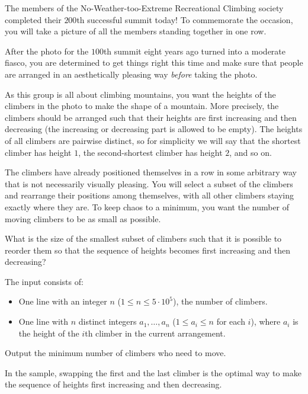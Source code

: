 

\newcommand{\maxn}{5 \cdot 10^5}

The members of the No-Weather-too-Extreme Recreational Climbing society
completed their $200$th successful summit today! To commemorate the occasion,
you will take a picture of all the members standing together in one row.

After the photo for the $100$th summit eight years ago turned into a moderate
fiasco, you are determined to get things right this time and make sure that
people are arranged in an aesthetically pleasing way \textit{before} taking the
photo.

As this group is all about climbing mountains, you want the heights of the
climbers in the photo to make the shape of a mountain. More
precisely, the climbers
should be arranged such that their heights are first increasing and then
decreasing (the increasing or decreasing part is allowed to be empty). The
heights of all climbers are pairwise distinct, so for simplicity we will say
that the shortest climber has height $1$, the second-shortest climber has
height $2$, and so on.

The climbers have already positioned themselves in a row in some arbitrary way
that is not necessarily visually pleasing. You will select a subset of the
climbers and rearrange their positions among themselves, with all other climbers
staying exactly where they are. To keep chaos to a minimum, you want the number
of moving climbers to be as small as possible.

What is the size of the smallest subset of climbers such that it is possible
to reorder them so that the sequence of heights becomes first increasing and then
decreasing?

\begin{Input}
    The input consists of:
    \begin{itemize}
        \item One line with an integer $n$ ($1\leq n\leq \maxn$), the number of
			climbers.
        \item One line with $n$ distinct integers $a_1, \ldots, a_n$ ($1 \leq a_i \leq n$ for each $i$), where $a_i$ is the height of the $i$th climber in the current arrangement.
    \end{itemize}
\end{Input}

\begin{Output}
    Output the minimum number of climbers who need to move.
\end{Output}

In the sample, swapping the first and the last climber is the optimal way
to make the sequence of heights first increasing and then decreasing.
